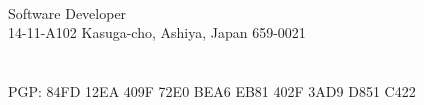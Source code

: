 \documentclass{cv_style_yui}
\begin{document}

\begin{center} 
   \\
  Software Developer \\
  14-11-A102 Kasuga-cho, Ashiya, Japan 659-0021 \\
   \\
   \\
  PGP: 84FD 12EA 409F 72E0 BEA6 EB81 402F 3AD9 D851 C422  \\
    \\
   \\
\end{center}


\vphantom{A}

\vphantom{A}

\vphantom{A}
\end{document}
